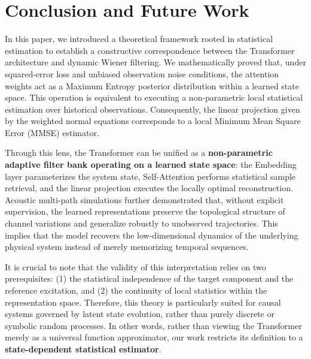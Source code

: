 \documentclass[conference]{IEEEtran}
\begin{document}

\section{Conclusion and Future Work}
\label{sec:conclusion}

In this paper, we introduced a theoretical framework rooted in statistical estimation to establish a constructive correspondence between the Transformer architecture and dynamic Wiener filtering. We mathematically proved that, under squared-error loss and unbiased observation noise conditions, the attention weights act as a Maximum Entropy posterior distribution within a learned state space. This operation is equivalent to executing a non-parametric local statistical estimation over historical observations. Consequently, the linear projection given by the weighted normal equations corresponds to a local Minimum Mean Square Error (MMSE) estimator.

Through this lens, the Transformer can be unified as a \textbf{non-parametric adaptive filter bank operating on a learned state space}: the Embedding layer parameterizes the system state, Self-Attention performs statistical sample retrieval, and the linear projection executes the locally optimal reconstruction. Acoustic multi-path simulations further demonstrated that, without explicit supervision, the learned representations preserve the topological structure of channel variations and generalize robustly to unobserved trajectories. This implies that the model recovers the low-dimensional dynamics of the underlying physical system instead of merely memorizing temporal sequences.

It is crucial to note that the validity of this interpretation relies on two prerequisites: (1) the statistical independence of the target component and the reference excitation, and (2) the continuity of local statistics within the representation space. Therefore, this theory is particularly suited for causal systems governed by latent state evolution, rather than purely discrete or symbolic random processes. In other words, rather than viewing the Transformer merely as a universal function approximator, our work restricts its definition to a \textbf{state-dependent statistical estimator}.
\end{document}
